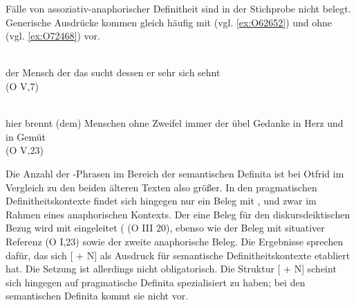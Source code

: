 
Fälle von assoziativ-anaphorischer Definitheit sind in der Stichprobe nicht belegt. Generische Ausdrücke kommen gleich häufig mit (vgl. \ref{ex:O62652}) und ohne (vgl. \ref{ex:O72468})  vor.
\enlargethispage{5ex}

%

\begin{exe}
\ex \label{ex:O62652} \gll {}         \\
{der} {Mensch} {der} {das} {sucht} {dessen} {er} {sehr} {sich sehnt} \\
\glt   {} (O V,7)
\end{exe}

%

\begin{exe}
\ex \label{ex:O72468} \gll {}               \\
{hier} {brennt} {(dem) Menschen} {ohne} {Zweifel} {immer} {der} {übel} {Gedanke} {in} {Herz} {und} {in} {Gemüt} \\
\glt   {}  (O V,23)
\end{exe}

Die Anzahl der -Phrasen im Bereich der semantischen Definita ist bei Otfrid im Vergleich zu den beiden älteren Texten also größer. In den pragmatischen Definitheitskontexte findet sich hingegen nur ein Beleg mit , und zwar im Rahmen eines anaphorischen Kontexts. Der eine Beleg für den diskursdeiktischen Bezug wird mit  eingeleitet (  (O III 20), ebenso wie der Beleg mit situativer Referenz   (O I,23) sowie der zweite anaphorische Beleg. Die Ergebnisse sprechen dafür, das sich [ + N] als Ausdruck für semantische Definitheitskontexte etabliert hat. Die Setzung ist allerdings nicht obligatorisch. Die Struktur [ + N] scheint sich hingegen auf pragmatische Definita spezialisiert zu haben; bei den semantischen Definita kommt sie nicht vor.

